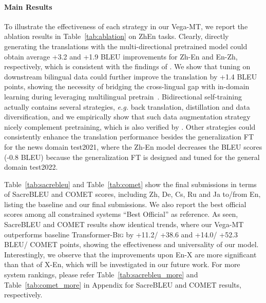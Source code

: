 \documentclass[11pt,a4paper]{article}
\begin{document}
\paragraph{Main Results}
To illustrate the effectiveness of each strategy in our Vega-MT, we report the ablation results in Table~\ref{tab:ablation} on ZhEn tasks. Clearly, directly generating the translations with the multi-directional pretrained model could obtain average +3.2 and +1.9 BLEU improvements for Zh-En and En-Zh, respectively, which is consistent with the findings of \citet{facebook2021}. We show that tuning on downstream bilingual data could further improve the translation by +1.4 BLEU points, showing the necessity of bridging the cross-lingual gap with in-domain learning during leveraging multilingual pretrain~\cite{Zan2022BridgingCG}. 
Bidirectional self-training actually contains several strategies, \textit{e.g.} back translation, distillation and data diversification, and we empirically show that such data augmentation strategy nicely complement pretraining, which is also verified by \citet{Liu2021OnTC}.
Other strategies could consistently enhance the translation performance besides the generalization FT for the news domain test2021, where the Zh-En model decreases the BLEU scores (-0.8 BLEU) because the generalization FT is designed and tuned for the general domain test2022.

Table~\ref{tab:sacrebleu} and Table~\ref{tab:comet} show the final submissions in terms of SacreBLEU and COMET scores, including Zh, De, Cs, Ru and Ja to/from En, listing the baseline and our final submissions.
We also report the best official scores among all constrained systems ``Best Official'' as reference.
As seen, SacreBLEU and COMET results show identical trends, where our Vega-MT outperforms baseline Transformer-\textsc{Big} by +11.2/ +38.6 and +14.0/ +52.3 BLEU/ COMET points, showing the effectiveness and universality of our model. Interestingly, we observe that the improvements upon En-X are more significant than that of X-En, which will be investigated in our future work.
For more system rankings, please refer Table~\ref{tab:sacrebleu_more} and Table~\ref{tab:comet_more} in Appendix for SacreBLEU and COMET results, respectively.
\end{document}
